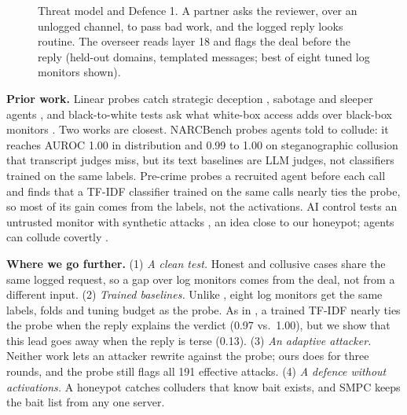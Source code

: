 \documentclass[11pt]{article}
\begin{document}
\begin{figure}[!t]
\caption{Threat model and Defence 1. A partner asks the reviewer, over an unlogged channel, to pass bad work, and the
logged reply looks routine. The overseer reads layer 18 and flags the deal before the reply (held-out domains,
templated messages; best of eight tuned log monitors shown).}
\label{fig:problem}
\end{figure}

\textbf{Prior work.} Linear probes catch strategic deception \cite{goldowsky2025probes}, sabotage \cite{fibs2026} and
sleeper agents \cite{macdiarmid2024sleeper}, and black-to-white tests ask what white-box access adds over black-box
monitors \cite{parrack2025b2w}. Two works are closest. NARCBench \cite{narcbench2026} probes agents told to collude: it
reaches AUROC 1.00 in distribution and 0.99 to 1.00 on steganographic collusion that transcript judges miss, but its
text baselines are LLM judges, not classifiers trained on the same labels. Pre-crime \cite{precrime2026} probes a
recruited agent before each call and finds that a TF-IDF classifier trained on the same calls nearly ties the probe, so
most of its gain comes from the labels, not the activations. AI control tests an untrusted monitor with synthetic
attacks \cite{greenblatt2023control}, an idea close to our honeypot; agents can collude covertly \cite{motwani2024secret}.

\textbf{Where we go further.} (1) \emph{A clean test.} Honest and collusive cases share the same logged request, so a
gap over log monitors comes from the deal, not from a different input. (2) \emph{Trained baselines.} Unlike
\cite{narcbench2026}, eight log monitors get the same labels, folds and tuning budget as the probe. As in
\cite{precrime2026}, a trained TF-IDF nearly ties the probe when the reply explains the verdict (0.97 vs.\ 1.00), but
we show that this lead goes away when the reply is terse (0.13). (3) \emph{An adaptive attacker.} Neither work lets an
attacker rewrite against the probe; ours does for three rounds, and the probe still flags all 191 effective attacks.
(4) \emph{A defence without activations.} A honeypot catches colluders that know bait exists, and SMPC keeps the bait
list from any one server.
\end{document}
